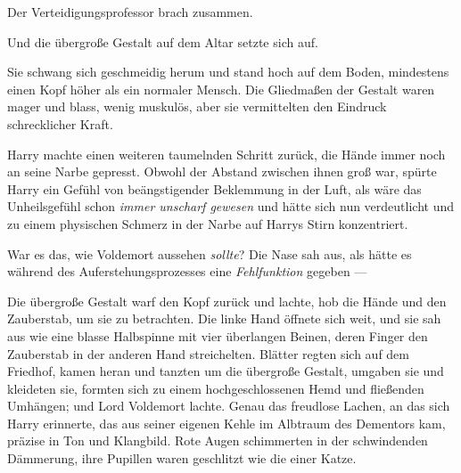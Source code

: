 Der Verteidigungsprofessor brach zusammen.

Und die übergroße Gestalt auf dem Altar setzte sich auf.

Sie schwang sich geschmeidig herum und stand hoch auf dem Boden, mindestens einen Kopf höher als ein normaler Mensch. Die Gliedmaßen der Gestalt waren mager und blass, wenig muskulös, aber sie vermittelten den Eindruck schrecklicher Kraft.

Harry machte einen weiteren taumelnden Schritt zurück, die Hände immer noch an seine Narbe gepresst. Obwohl der Abstand zwischen ihnen groß war, spürte Harry ein Gefühl von beängstigender Beklemmung in der Luft, als wäre das Unheilsgefühl schon \emph{immer unscharf gewesen} und hätte sich nun verdeutlicht und zu einem physischen Schmerz in der Narbe auf Harrys Stirn konzentriert.

War es das, wie Voldemort aussehen \emph{sollte}? Die Nase sah aus, als hätte es während des Auferstehungsprozesses eine \emph{Fehlfunktion} gegeben —

Die übergroße Gestalt warf den Kopf zurück und lachte, hob die Hände und den Zauberstab, um sie zu betrachten. Die linke Hand öffnete sich weit, und sie sah aus wie eine blasse Halbspinne mit vier überlangen Beinen, deren Finger den Zauberstab in der anderen Hand streichelten. Blätter regten sich auf dem Friedhof, kamen heran und tanzten um die übergroße Gestalt, umgaben sie und kleideten sie, formten sich zu einem hochgeschlossenen Hemd und fließenden Umhängen; und Lord Voldemort lachte. Genau das freudlose Lachen, an das sich Harry erinnerte, das aus seiner eigenen Kehle im Albtraum des Dementors kam, präzise in Ton und Klangbild.
Rote Augen schimmerten in der schwindenden Dämmerung, ihre Pupillen waren geschlitzt wie die einer Katze.

